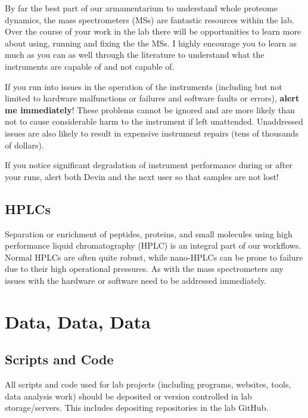 \documentclass[
]{book}
\begin{document}
By far the best part of our armamentarium to understand whole proteome dynamics, the mass spectrometers (MSs) are fantastic resources within the lab. Over the course of your work in the lab there will be opportunities to learn more about using, running and fixing the the MSs. I highly encourage you to learn as much as you can as well through the literature to understand what the instruments are capable of and not capable of.

If you run into issues in the operation of the instruments (including but not limited to hardware malfunctions or failures and software faults or errors), \textbf{alert me immediately}! These problems cannot be ignored and are more likely than not to cause considerable harm to the instrument if left unattended. Unaddressed issues are also likely to result in expensive instrument repairs (tens of thousands of dollars).

If you notice significant degradation of instrument performance during or after your runs, alert both Devin and the next user so that samples are not lost!

\hypertarget{hplcs}{%
\subsection{HPLCs}\label{hplcs}}

Separation or enrichment of peptides, proteins, and small molecules using high performance liquid chromatography (HPLC) is an integral part of our workflows. Normal HPLCs are often quite robust, while nano-HPLCs can be prone to failure due to their high operational pressures. As with the mass spectrometers any issues with the hardware or software need to be addressed immediately.

\hypertarget{data-data-data}{%
\section{Data, Data, Data}\label{data-data-data}}

\hypertarget{scripts-and-code}{%
\subsection{Scripts and Code}\label{scripts-and-code}}

All scripts and code used for lab projects (including programs, websites, tools, data analysis work) should be deposited or version controlled in lab storage/servers. This includes depositing repositories in the lab GitHub.
\end{document}
